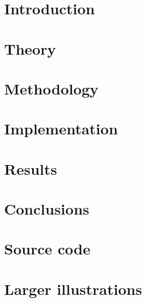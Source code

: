 \documentclass[12pt,a4paper]{report}
\begin{document}
\chapter{Introduction}
    
    \newpage
\chapter{Theory}
    
    \newpage
\chapter{Methodology}
    
    \newpage
\chapter{Implementation}
    
    \newpage
\chapter{Results}
    
    \newpage
\chapter{Conclusions}
    


\newpage
\renewcommand{\bibname}{\hspace{42pt}References} 
 


\appendix
\begin{appendices}
\chapter{Source code}
    
\chapter{Larger illustrations}
\end{appendices}
\end{document}
